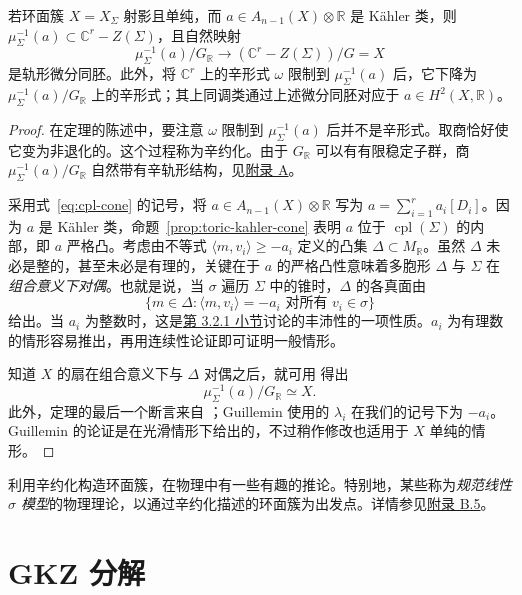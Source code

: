 \begin{theorem}\label{thm:toric-symplectic-reduction}
若环面簇 $X=X_\Sigma$ 射影且单纯，而 $a\in A_{n-1}(X)\otimes\mathbb R$ 是 Kähler 类，则 $\mu_\Sigma^{-1}(a)\subset\mathbb C^r-Z(\Sigma)$，且自然映射
\[
\mu_\Sigma^{-1}(a)/G_{\mathbb R}
\longrightarrow(\mathbb C^r-Z(\Sigma))/G=X
\]
是轨形微分同胚。此外，将 $\mathbb C^r$ 上的辛形式 $\omega$ 限制到 $\mu_\Sigma^{-1}(a)$ 后，它下降为 $\mu_\Sigma^{-1}(a)/G_{\mathbb R}$ 上的辛形式；其上同调类通过上述微分同胚对应于 $a\in H^2(X,\mathbb R)$。
\end{theorem}
\begin{proof}
在定理的陈述中，要注意 $\omega$ 限制到 $\mu_\Sigma^{-1}(a)$ 后并不是辛形式。取商恰好使它变为非退化的。这个过程称为辛约化。由于 $G_{\mathbb R}$ 可以有有限稳定子群，商 $\mu_\Sigma^{-1}(a)/G_{\mathbb R}$ 自然带有辛轨形结构，见\hyperref[app:singular-varieties]{附录 A}。

采用式~\eqref{eq:cpl-cone} 的记号，将 $a\in A_{n-1}(X)\otimes\mathbb R$ 写为 $a=\sum_{i=1}^r a_i[D_i]$。因为 $a$ 是 Kähler 类，命题~\ref{prop:toric-kahler-cone} 表明 $a$ 位于 $\operatorname{cpl}(\Sigma)$ 的内部，即 $a$ 严格凸。考虑由不等式 $\langle m,v_i\rangle\geq-a_i$ 定义的凸集 $\Delta\subset M_{\mathbb R}$。虽然 $\Delta$ 未必是整的，甚至未必是有理的，关键在于 $a$ 的严格凸性意味着多胞形 $\Delta$ 与 $\Sigma$ 在\emph{组合意义下对偶}。也就是说，当 $\sigma$ 遍历 $\Sigma$ 中的锥时，$\Delta$ 的各真面由
\[
\{m\in\Delta:\langle m,v_i\rangle=-a_i
\text{ 对所有 }v_i\in\sigma\}
\]
给出。当 $a_i$ 为整数时，这是\hyperref[subsec:toric-polytopes]{第 3.2.1 小节}讨论的丰沛性的一项性质。$a_i$ 为有理数的情形容易推出，再用连续性论证即可证明一般情形。

知道 $X$ 的扇在组合意义下与 $\Delta$ 对偶之后，就可用  得出
\[
\mu_\Sigma^{-1}(a)/G_{\mathbb R}\simeq X.
\]
此外，定理的最后一个断言来自 ；Guillemin 使用的 $\lambda_i$ 在我们的记号下为 $-a_i$。Guillemin 的论证是在光滑情形下给出的，不过稍作修改也适用于 $X$ 单纯的情形。
\end{proof}

利用辛约化构造环面簇，在物理中有一些有趣的推论。特别地，某些称为\emph{规范线性 $\sigma$ 模型}的物理理论，以通过辛约化描述的环面簇为出发点。详情参见\hyperref[sec:gauged-linear-sigma-models]{附录 B.5}。

\section{GKZ 分解}\label{sec:gkz-decomposition}

